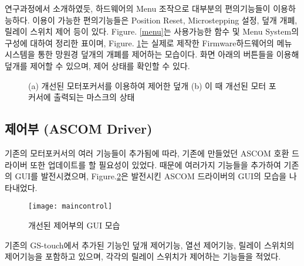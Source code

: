 연구과정에서 소개하였듯, 하드웨어의 Menu 조작으로 대부분의 편의기능들이 이용하능하다. 이용이 가능한 편의기능들은 Position Reset, Microstepping 설정, 덮개 개폐, 릴레이 스위치 제어 등이 있다. \textrm{Figure}. \ref{menu}는 사용가능한 함수 및 Menu System의 구성에 대하여 정리한 표이며, \textrm{Figure}. \ref{mask_status}는 실제로 제작한 Firmware하드웨어의 메뉴 시스템을 통한 망원경 덮개의 개폐를 제어하는 모습이다. 화면 아래의 버튼들을 이용해 덮개를 제어할 수 있으며, 제어 상태를 확인할 수 있다.

	\begin{figure}[ht]
	\begin{center}
	\end{center}
	\caption{(a) 개선된 모터포커서를 이용하여 제어한 덮개 (b) 이 때 개선된 모터 포커서에 출력되는 마스크의 상태}
	\label{mask_status}
\end{figure}
 
\newpage

\subsection{제어부 (ASCOM Driver)}


 기존의 모터포커서의 여러 기능들이 추가됨에 따라, 기존에 만들었던 ASCOM 호환 드라이버 또한 업데이트를 할 필요성이 있었다. 때문에 여러가지 기능들을 추가하여 기존의 GUI를 발전시켰으며, \textrm{Figure}.\ref{maincontrol}은 발전시킨 ASCOM 드라이버의 GUI의 모습을 나타내었다.
 
 \begin{figure}[h]
	\begin{center}
		\texttt{[image: maincontrol]}
	\end{center}
	\caption{개선된 제어부의 GUI 모습}
	\label{maincontrol}
\end{figure}

 기존의 GS-touch에서 추가된 기능인 덮개 제어기능, 열선 제어기능, 릴레이 스위치의 제어기능을 포함하고 있으며, 각각의 릴레이 스위치가 제어하는 기능들을 적었다.
